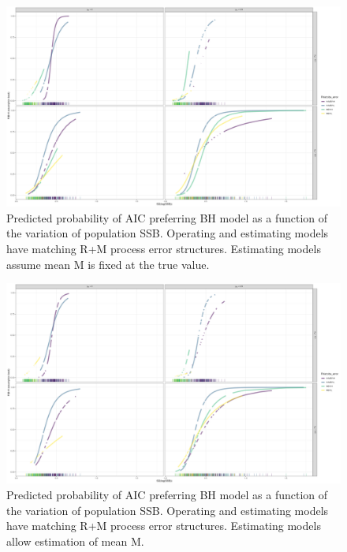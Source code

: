 \documentclass[
  12pt,
]{article}
\begin{document}
\begin{figure}
\caption{Predicted probability of AIC preferring BH model as a function of the variation of population SSB. Operating and estimating models have matching R+M process error structures. Estimating models assume mean M is fixed at the true value.}\label{M_om_MF_BH_glm_AIC_plots}
\begin{center}
\includegraphics[width = \textwidth]{M_om_MF_pred_BH_best.png}
\end{center}
\end{figure}

\begin{figure}
\caption{Predicted probability of AIC preferring BH model as a function of the variation of population SSB. Operating and estimating models have matching R+M process error structures. Estimating models allow estimation of mean M.}\label{M_om_ME_BH_glm_AIC_plots}
\begin{center}
\includegraphics[width = \textwidth]{M_om_ME_pred_BH_best.png}
\end{center}
\end{figure}
\end{document}
